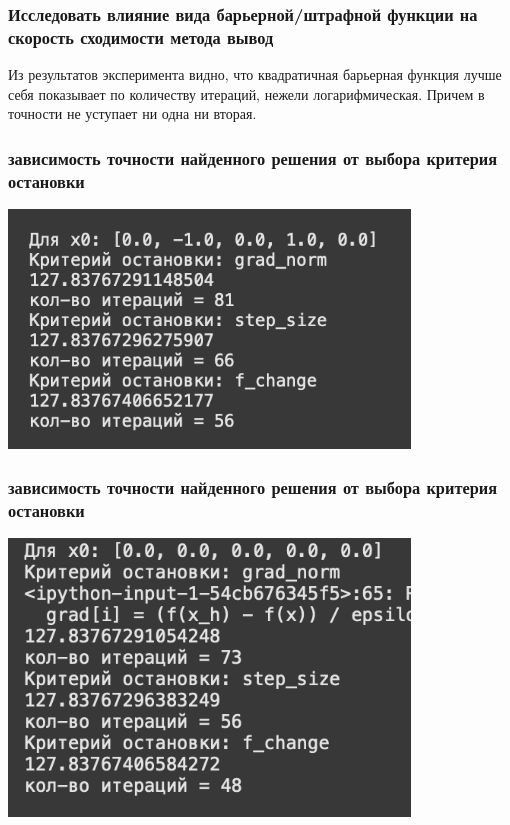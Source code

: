 \documentclass[12pt,pdf,hyperref={unicode}]{beamer}
\begin{document}
\begin{frame}
\frametitle{Исследовать влияние вида барьерной/штрафной функции на скорость сходимости метода вывод}
Из результатов эксперимента видно, что квадратичная барьерная функция лучше себя показывает по количеству итераций, нежели логарифмическая. Причем в точности не уступает ни одна ни вторая.
\end{frame}

\begin{frame}
\frametitle{ зависимость точности найденного решения от выбора критерия остановки}
\begin{center}
    \includegraphics[width=0.8\textwidth]{stop1.png}
\end{center}
\end{frame}

\begin{frame}
\frametitle{ зависимость точности найденного решения от выбора критерия остановки}
\begin{center}
    \includegraphics[width=0.8\textwidth]{stop2.png}
\end{center}
\end{frame}
\end{document}
